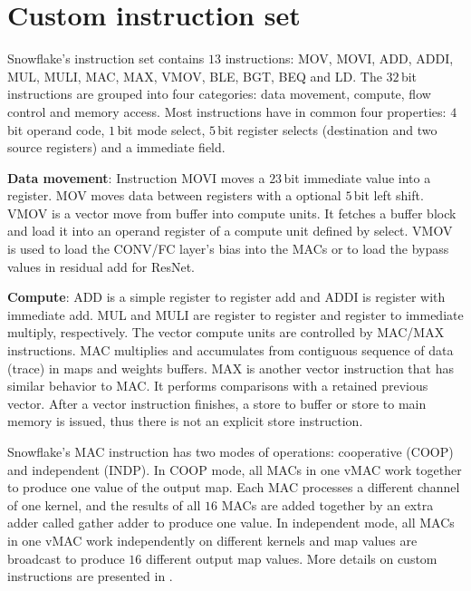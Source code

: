 \documentclass{sig-alternate}
\begin{document}

\section{Custom instruction set}\label{sec:isa}
Snowflake's instruction set contains $13$ instructions: MOV, MOVI, ADD, ADDI, MUL, MULI, MAC, MAX, VMOV, BLE, BGT, BEQ and LD. The $32$\,bit instructions are grouped into four categories: data movement, compute, flow control and memory access. Most instructions have in common four properties: $4$\,bit operand code, $1$\,bit mode select, $5$\,bit register selects (destination and two source registers) and a immediate field.

\textbf{Data movement}: Instruction MOVI moves a $23$\,bit immediate value into a register. MOV moves data between registers with a optional $5$\,bit left shift. VMOV is a vector move from buffer into compute units. It fetches a buffer block and load it into an operand register of a compute unit defined by select. VMOV is used to load the CONV/FC layer's bias into the MACs or to load the bypass values in residual add for ResNet.


\textbf{Compute}: ADD is a simple register to register add and ADDI is register with immediate add. MUL and MULI are register to register and register to immediate multiply, respectively. The vector compute units are controlled by MAC/MAX instructions. MAC multiplies and accumulates from contiguous sequence of data (trace) in maps and weights buffers. MAX is another vector instruction that has similar behavior to MAC. It performs comparisons with a retained previous vector. After a vector instruction finishes, a store to buffer or store to main memory is issued, thus there is not an explicit store instruction. 

Snowflake's MAC instruction has two modes of operations: cooperative (COOP) and independent (INDP). In COOP mode, all MACs in one vMAC work together to produce one value of the output map. Each MAC processes a different channel of one kernel, and the results of all $16$ MACs are added together by an extra adder called gather adder to produce one value. In independent mode, all MACs in one vMAC work independently on different kernels and map values are broadcast to produce $16$ different output map values. More details on custom instructions are presented in \cite{snowflake}.
\end{document}
